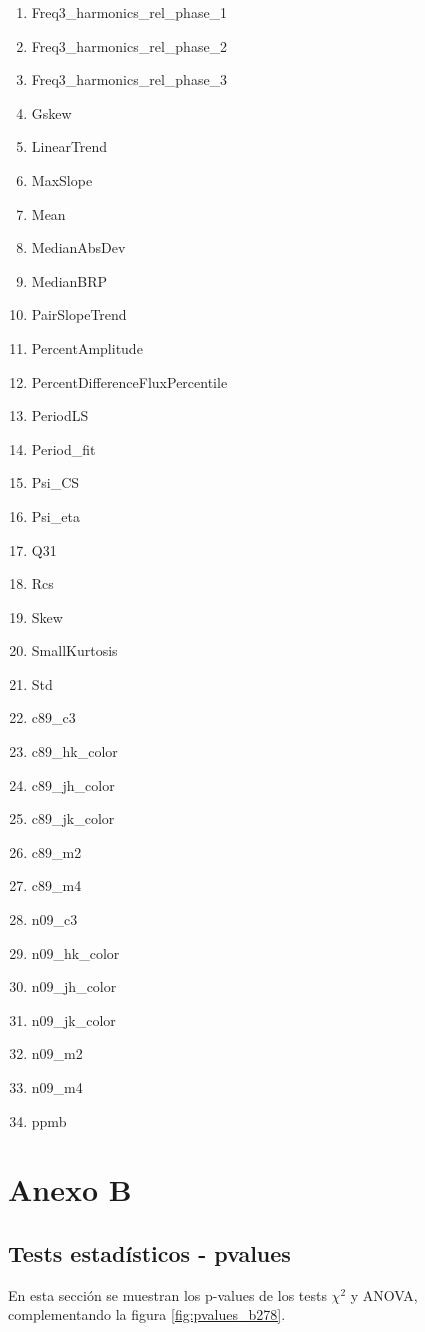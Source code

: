 \begin{appendix}
\begin{multicols}{2}
\begin{enumerate}[noitemsep]
\item Freq3\_harmonics\_rel\_phase\_1
\item Freq3\_harmonics\_rel\_phase\_2
\item Freq3\_harmonics\_rel\_phase\_3
\item Gskew
\item LinearTrend
\item MaxSlope
\item Mean
\item MedianAbsDev
\item MedianBRP
\item PairSlopeTrend
\item PercentAmplitude
\item PercentDifferenceFluxPercentile
\item PeriodLS
\item Period\_fit
\item Psi\_CS
\item Psi\_eta
\item Q31
\item Rcs
\item Skew
\item SmallKurtosis
\item Std
\item c89\_c3
\item c89\_hk\_color
\item c89\_jh\_color
\item c89\_jk\_color
\item c89\_m2
\item c89\_m4
\item n09\_c3
\item n09\_hk\_color
\item n09\_jh\_color
\item n09\_jk\_color
\item n09\_m2
\item n09\_m4
\item ppmb
\end{enumerate}
\end{multicols}

\chapter{Anexo B}\label{anexoB}

\section{Tests estadísticos - pvalues}
\label{anexo_b_pvalues}
 En esta sección se muestran los p-values de los tests $\chi^2$ y ANOVA, complementando la figura \ref{fig:pvalues_b278}.
 

\end{appendix}
